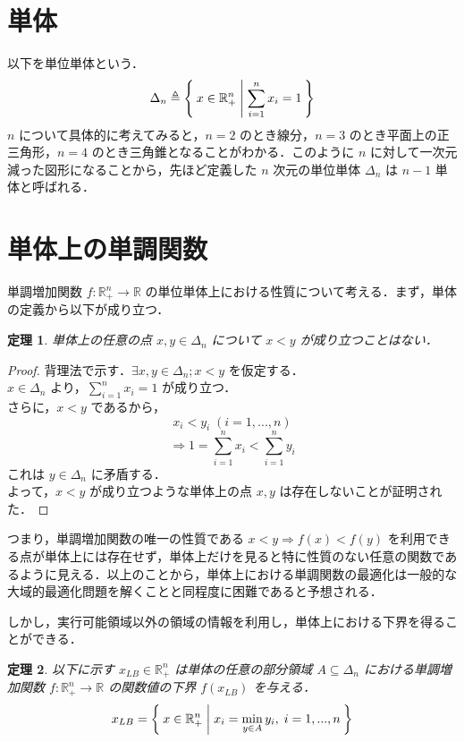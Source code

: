 \documentclass[a4paper,11pt]{jreport}
\newtheorem{theorem}{定理}
\begin{document}
\section{単体}

以下を単位単体という．
$$ \Delta_n \triangleq \Set{ x \in \mathbb{R}^n_{+} | \sum_{i=1}^{n} x_i = 1 } $$
$ n $ について具体的に考えてみると，$ n=2 $ のとき線分，$ n=3 $ のとき平面上の正三角形，$ n=4 $ のとき三角錐となることがわかる．このように $n$ に対して一次元減った図形になることから，先ほど定義した $n$ 次元の単位単体 $ \Delta_n $ は $ n-1 $ 単体と呼ばれる．

\section{単体上の単調関数}

単調増加関数 $ f : \mathbb{R}^n_{+} \to \mathbb{R} $ の単位単体上における性質について考える．まず，単体の定義から以下が成り立つ．

\begin{theorem}
単体上の任意の点 $ x, y \in \Delta_n $ について $ x < y $ が成り立つことはない．
\end{theorem}

\begin{proof}
背理法で示す．$ \exists x, y \in \Delta_n; x < y $ を仮定する．\\
$ x \in \Delta_n $ より，$ \sum_{i=1}^n x_i = 1 $ が成り立つ．\\
さらに，$ x < y $ であるから，
$$ x_i < y_i \; (i = 1, ..., n) $$
$$ \Rightarrow 1 = \sum_{i=1}^n x_i < \sum_{i=1}^n y_i $$
これは $ y \in \Delta_n $ に矛盾する．\\
よって，$ x < y $ が成り立つような単体上の点 $ x, y $ は存在しないことが証明された．
\end{proof}

つまり，単調増加関数の唯一の性質である $ x < y \Rightarrow f(x) < f(y) $ を利用できる点が単体上には存在せず，単体上だけを見ると特に性質のない任意の関数であるように見える．以上のことから，単体上における単調関数の最適化は一般的な大域的最適化問題を解くことと同程度に困難であると予想される．\par
しかし，実行可能領域以外の領域の情報を利用し，単体上における下界を得ることができる．\\

\begin{theorem}
以下に示す $ x_{LB} \in \mathbb{R}^n_{+} $ は単体の任意の部分領域 $ A \subseteq \Delta_n $ における単調増加関数 $ f :  \mathbb{R}^n_{+} \to \mathbb{R} $ の関数値の下界 $ f(x_{LB}) $ を与える．
$$ x_{LB} = \Set{ x \in \mathbb{R}^n_{+} | x_i = \min_{y \in A } y_i, \; i = 1, ..., n } $$
\end{theorem}
\end{document}
